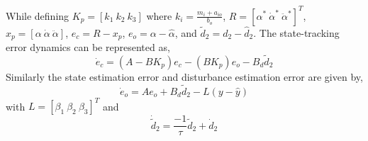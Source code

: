 \documentclass[conference]{IEEEtran}
\begin{document}
		While defining $K_p = [k_1\ k_2\ k_3]$ where $k_i = \frac{m_i + a_{io}}{b_o}$, $R = [\alpha^* \ \dot{\alpha}^* \ \ddot{\alpha}^*]^T$, $x_p = [\alpha \ \dot{\alpha} \ \ddot{\alpha}]$, $e_c = R - x_p$, $e_o = \alpha - \hat{\alpha}$, and $\tilde{d}_2 = d_2 - \hat{d}_2$. The state-tracking error dynamics can be represented as,
		\begin{equation}
			\dot{e}_c = (A - BK_p)e_c - (BK_p)e_o - B_d\tilde{d}_2 \label{e_con}
		\end{equation}
		Similarly the state estimation error and disturbance estimation error are given by,
		\begin{equation}
			\dot{e}_o = Ae_o + B_d\tilde{d}_2 - L(y - \hat{y}) \label{e_obs}
		\end{equation}
		with $L = [\beta_1 \ \beta_2 \ \beta_3]^T$ and 
		\begin{equation}
			\dot{\tilde{d}}_2 = \frac{-1}{\tau}\tilde{d}_2 + \dot{d}_2 \label{e_dist}
		\end{equation}
				
\end{document}
